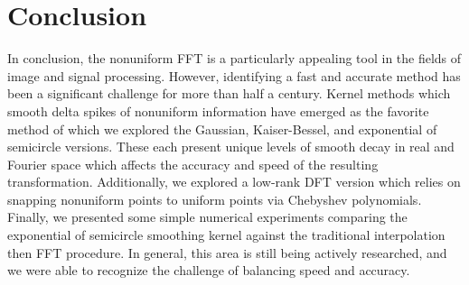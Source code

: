 \section{Conclusion}

In conclusion, the nonuniform FFT is a particularly appealing tool in the fields of image and signal processing.
However, identifying a fast and accurate method has been a significant challenge for more than half a century.
Kernel methods which smooth delta spikes of nonuniform information have emerged as the favorite method of which we explored the Gaussian, Kaiser-Bessel, and exponential of semicircle versions.
These each present unique levels of smooth decay in real and Fourier space which affects the accuracy and speed of the resulting transformation.
Additionally, we explored a low-rank DFT version which relies on snapping nonuniform points to uniform points via Chebyshev polynomials.
Finally, we presented some simple numerical experiments comparing the exponential of semicircle smoothing kernel against the traditional interpolation then FFT procedure.
In general, this area is still being actively researched, and we were able to recognize the challenge of balancing speed and accuracy.